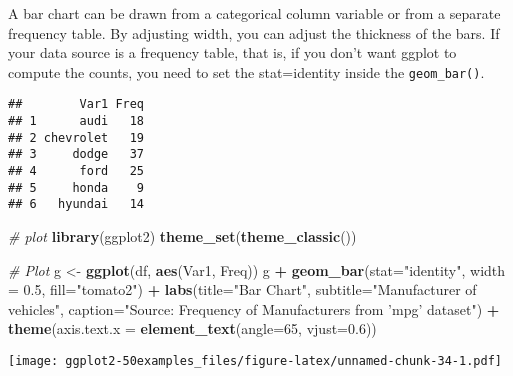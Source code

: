 \documentclass[a4paper]{article}
\newenvironment{Shaded}{\begin{snugshade}}{\end{snugshade}}
\newcommand{\KeywordTok}[1]{\textcolor[rgb]{0.13,0.29,0.53}{\textbf{#1}}}
\newcommand{\DataTypeTok}[1]{\textcolor[rgb]{0.13,0.29,0.53}{#1}}
\newcommand{\DecValTok}[1]{\textcolor[rgb]{0.00,0.00,0.81}{#1}}
\newcommand{\FloatTok}[1]{\textcolor[rgb]{0.00,0.00,0.81}{#1}}
\newcommand{\StringTok}[1]{\textcolor[rgb]{0.31,0.60,0.02}{#1}}
\newcommand{\CommentTok}[1]{\textcolor[rgb]{0.56,0.35,0.01}{\textit{#1}}}
\newcommand{\OperatorTok}[1]{\textcolor[rgb]{0.81,0.36,0.00}{\textbf{#1}}}
\newcommand{\NormalTok}[1]{#1}
\begin{document}
A bar chart can be drawn from a categorical column variable or from a
separate frequency table. By adjusting width, you can adjust the
thickness of the bars. If your data source is a frequency table, that
is, if you don't want ggplot to compute the counts, you need to set the
stat=identity inside the \texttt{geom\_bar()}.

\begin{Shaded}
\end{Shaded}

\begin{verbatim}
##        Var1 Freq
## 1      audi   18
## 2 chevrolet   19
## 3     dodge   37
## 4      ford   25
## 5     honda    9
## 6   hyundai   14
\end{verbatim}

\begin{Shaded}
\begin{Highlighting}[]
\CommentTok{# plot}
\KeywordTok{library}\NormalTok{(ggplot2)}
\KeywordTok{theme_set}\NormalTok{(}\KeywordTok{theme_classic}\NormalTok{())}

\CommentTok{# Plot}
\NormalTok{g <-}\StringTok{ }\KeywordTok{ggplot}\NormalTok{(df, }\KeywordTok{aes}\NormalTok{(Var1, Freq))}
\NormalTok{g }\OperatorTok{+}\StringTok{ }\KeywordTok{geom_bar}\NormalTok{(}\DataTypeTok{stat=}\StringTok{"identity"}\NormalTok{, }\DataTypeTok{width =} \FloatTok{0.5}\NormalTok{, }\DataTypeTok{fill=}\StringTok{"tomato2"}\NormalTok{) }\OperatorTok{+}\StringTok{ }
\StringTok{      }\KeywordTok{labs}\NormalTok{(}\DataTypeTok{title=}\StringTok{"Bar Chart"}\NormalTok{, }
           \DataTypeTok{subtitle=}\StringTok{"Manufacturer of vehicles"}\NormalTok{, }
           \DataTypeTok{caption=}\StringTok{"Source: Frequency of Manufacturers from 'mpg' dataset"}\NormalTok{) }\OperatorTok{+}
\StringTok{      }\KeywordTok{theme}\NormalTok{(}\DataTypeTok{axis.text.x =} \KeywordTok{element_text}\NormalTok{(}\DataTypeTok{angle=}\DecValTok{65}\NormalTok{, }\DataTypeTok{vjust=}\FloatTok{0.6}\NormalTok{))}
\end{Highlighting}
\end{Shaded}

\texttt{[image: ggplot2-50examples\_files/figure-latex/unnamed-chunk-34-1.pdf]}
\end{document}
